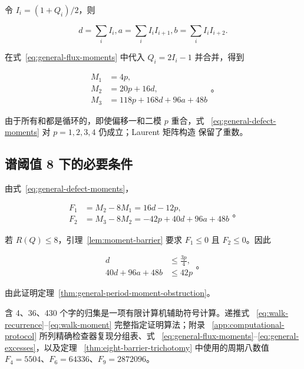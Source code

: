 令 \(I_i=(1+Q_i)/2\)，则

\begin{equation}
d=\sum_i I_i,       a=\sum_i I_iI_{i+1},       b=\sum_i I_iI_{i+2}.
\end{equation}

在式~\eqref{eq:general-flux-moments} 中代入 \(Q_i=2I_i-1\) 并合并，得到

\begin{equation}
\label{eq:general-defect-moments}
\begin{aligned}
M_{1}&=4p, \\
M_{2}&=20p+16d, \\
M_{3}&=118p+168d+96a+48b
\end{aligned}
\text{。}
\end{equation}

由于所有和都是循环的，即使偏移一和二模 \(p\) 重合，式~
\eqref{eq:general-defect-moments} 对 \(p=1,2,3,4\) 仍成立；Laurent 矩阵构造
保留了重数。

\subsection{谱阈值 8 下的必要条件}

由式~\eqref{eq:general-defect-moments}，

\begin{equation}
\label{eq:general-excesses}
\begin{aligned}
F_{1}&=M_{2}-8M_{1}=16d-12p, \\
F_{2}&=M_{3}-8M_{2}=-42p+40d+96a+48b
\end{aligned}
\text{。}
\end{equation}

若 \(R(Q)\leq8\)，引理~\ref{lem:moment-barrier} 要求 \(F_1\leq0\) 且
\(F_2\leq0\)。因此

\begin{equation}
\label{eq:general-necessary-conditions}
\begin{aligned}
d&\leq \frac{3p}{4}, \\
40d+96a+48b&\leq 42p
\end{aligned}
\text{。}
\end{equation}

由此证明定理~\ref{thm:general-period-moment-obstruction}。

含 4、36、430 个字的归集是一项有限计算机辅助符号计算。递推式~
\eqref{eq:walk-recurrence}--\eqref{eq:walk-moment} 完整指定证明算法；附录~
\ref{app:computational-protocol} 所列精确检查器复现分组表、式~
\eqref{eq:general-flux-moments}--\eqref{eq:general-excesses}，以及定理~
\ref{thm:eight-barrier-trichotomy} 中使用的周期八数值
\(F_4=5504\)、\(F_6=64336\)、\(F_9=2872096\)。

